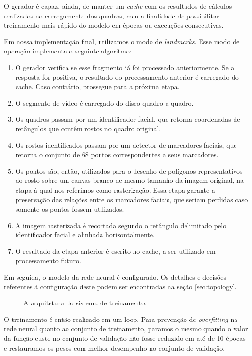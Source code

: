 O gerador é capaz, ainda, de manter um \textit{cache} com os resultados de cálculos realizados no carregamento dos quadros, com a finalidade de possibilitar treinamento mais rápido do modelo em épocas ou execuções consecutivas.

Em nossa implementação final, utilizamos o modo de \textit{landmarks}. Esse modo de operação implementa o seguinte algoritmo:

\begin{enumerate}
    \item O gerador verifica se esse fragmento já foi processado anteriormente. Se a resposta for positiva, o resultado do processamento anterior é carregado do cache. Caso contrário, prossegue para a próxima etapa.
    \item O segmento de vídeo é carregado do disco quadro a quadro. 
    \item Os quadros passam por um identificador facial, que retorna coordenadas de retângulos que contêm rostos no quadro original. 
    \item Os rostos identificados passam por um detector de marcadores faciais, que retorna o conjunto de 68 pontos correspondentes a seus marcadores. 
    \item Os pontos são, então, utilizados para o desenho de polígonos representativos do rosto sobre um canvas branco de mesmo tamanho da imagem original, na etapa à qual nos referimos como rasterização. Essa etapa garante a preservação das relações entre os marcadores faciais, que seriam perdidas caso somente os pontos fossem utilizados. 
    \item A imagem rasterizada é recortada segundo o retângulo delimitado pelo identificador facial e alinhada horizontalmente.
    \item O resultado da etapa anterior é escrito no cache, a ser utilizado em processamento futuro.
\end{enumerate}

Em seguida, o modelo da rede neural é configurado. Os detalhes e decisões referentes à configuração deste podem ser encontradas na seção \ref{sec:topology}. 

\begin{figure}[ht]
    \centering
    
    \caption{A arquitetura do sistema de treinamento.}
    \label{fig:arch_train}
\end{figure}

O treinamento é então realizado em um loop.
Para prevenção de \textit{overfitting} na rede neural quanto ao conjunto de treinamento, paramos o mesmo quando o valor da função custo no conjunto de validação não fosse reduzido em até de 10 épocas e restauramos os pesos com melhor desempenho no conjunto de validação.

